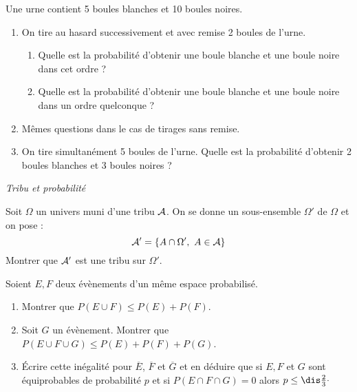 \documentclass[a4paper,10pt]{report}
\begin{document}
\begin{Exa} Une urne contient 5 boules blanches et 10 boules noires.

\begin{enumerate}
\item On tire au hasard successivement et avec remise 2 boules de l'urne.
\begin{enumerate}
\item Quelle est la probabilité d'obtenir une boule blanche et une boule noire dans cet ordre ?
\item Quelle est la probabilité d'obtenir une boule blanche et une boule noire dans un ordre quelconque ?
\end{enumerate}
\item Mêmes questions dans le cas de tirages sans remise.
\item On tire simultanément 5 boules de l'urne. Quelle est la probabilité d'obtenir 2 boules blanches et 3 boules noires ?
\end{enumerate}
\end{Exa}





\medskip

\begin{center}
\textit{{ {\large Tribu et probabilité}}}
\end{center}

\medskip


\begin{Exa}[\ding{80}]  Soit $\Omega$ un univers muni d'une tribu ${\cal A}$. On se donne un sous-ensemble $\Omega'$ de $\Omega$ et on pose :
 $${\cal A}'=\{A\cap \Omega',\ A\in{\cal A}\}$$
Montrer que ${\cal A}'$ est une tribu sur $\Omega'.$
\end{Exa}


\begin{Exa}  Soient $E,F$ deux évènements d'un même espace probabilisé.
\begin{enumerate}
\item Montrer que $P(E \cup F) \leq P(E) + P(F)$.
\item Soit $G$ un évènement. Montrer que $P(E \cup F \cup G) \leq P(E) + P(F) + P(G)$.
\item Écrire cette inégalité pour $\overline{E}$, $\overline{F}$ et $\overline{G}$ et en déduire que si $E,F$ et $G$ sont équiprobables de probabilité $p$ et si $P(E \cap F \cap G)=0$ alors $p \leq \dis \frac{2}{3} \cdot$
\end{enumerate}
\end{Exa}
\end{document}
